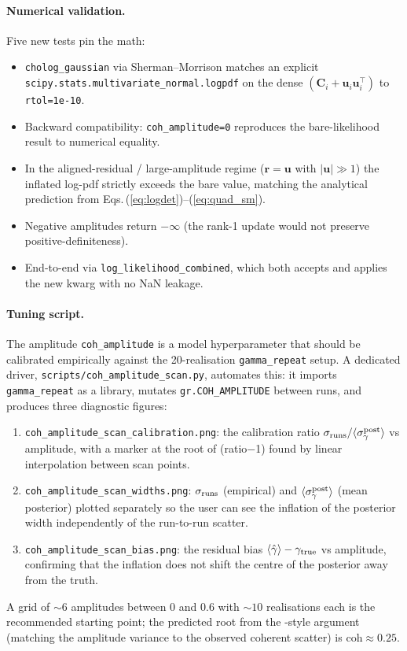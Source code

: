 \documentclass[11pt,a4paper]{article}
\begin{document}
\paragraph{Numerical validation.}
Five new tests pin the math:
\begin{itemize}[noitemsep]
  \item \texttt{cholog\_gaussian} via Sherman--Morrison matches an
        explicit \texttt{scipy.stats.multivariate\_normal.logpdf} on the
        dense $(\mathbf{C}_i+\mathbf{u}_i\mathbf{u}_i^\top)$ to
        \texttt{rtol=1e-10}.
  \item Backward compatibility: \texttt{coh\_amplitude=0} reproduces the
        bare-likelihood result to numerical equality.
  \item In the aligned-residual / large-amplitude regime ($\mathbf{r}=\mathbf{u}$
        with $|\mathbf{u}|\gg 1$) the inflated log-pdf strictly exceeds
        the bare value, matching the analytical prediction from
        Eqs.\,(\ref{eq:logdet})--(\ref{eq:quad_sm}).
  \item Negative amplitudes return $-\infty$ (the rank-1 update would
        not preserve positive-definiteness).
  \item End-to-end via \texttt{log\_likelihood\_combined}, which both
        accepts and applies the new kwarg with no NaN leakage.
\end{itemize}

\paragraph{Tuning script.}
The amplitude \texttt{coh\_amplitude} is a model hyperparameter that
should be calibrated empirically against the 20-realisation
\texttt{gamma\_repeat} setup.  A dedicated driver,
\texttt{scripts/coh\_amplitude\_scan.py}, automates this: it imports
\texttt{gamma\_repeat} as a library, mutates
\texttt{gr.COH\_AMPLITUDE} between runs, and produces three diagnostic
figures:
\begin{enumerate}[noitemsep]
  \item \texttt{coh\_amplitude\_scan\_calibration.png}: the calibration
        ratio $\sigma_{\rm runs}/\langle\sigma_\gamma^{\rm post}\rangle$
        vs amplitude, with a marker at the root of (ratio$-$1) found by
        linear interpolation between scan points.
  \item \texttt{coh\_amplitude\_scan\_widths.png}: $\sigma_{\rm runs}$
        (empirical) and $\langle\sigma_\gamma^{\rm post}\rangle$ (mean
        posterior) plotted separately so the user can see the inflation
        of the posterior width independently of the run-to-run scatter.
  \item \texttt{coh\_amplitude\_scan\_bias.png}: the residual bias
        $\langle\hat\gamma\rangle-\gamma_{\rm true}$ vs amplitude,
        confirming that the inflation does not shift the centre of the
        posterior away from the truth.
\end{enumerate}
A grid of $\sim 6$ amplitudes between $0$ and $0.6$ with
$\sim\!10$ realisations each is the recommended starting point; the
predicted root from the \citet{Mantz2010}-style argument (matching the
amplitude variance to the observed coherent scatter) is
$\mathrm{coh}\approx 0.25$.
\end{document}
